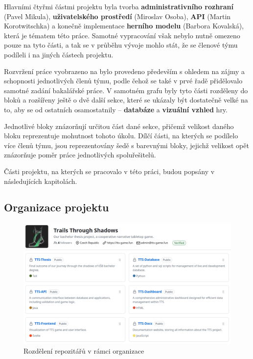 Hlavními čtyřmi částmi projektu byla tvorba \textbf{administrativního rozhraní} (Pavel Mikula), \textbf{uživatelského prostředí} (Miroslav Osoba), \textbf{API} (Martin Korotwitschka) a konečně implementace \textbf{herního modelu} (Barbora Kovalská), která je tématem této práce. Samotné vypracování však nebylo nutně omezeno pouze na tyto části, a tak se v průběhu vývoje mohlo stát, že se členové týmu podíleli i na jiných částech projektu.

Rozvržení práce vyobrazeno na  bylo provedeno především s ohledem na zájmy a schopnosti jednotlivých členů týmu, podle čehož se také v prvé řadě přidělovalo samotné zadání bakalářské práce. V samotném grafu byly tyto části rozděleny do bloků a rozšířeny ještě o dvě další sekce, které se ukázaly být dostatečně velké na to, aby se od ostatních osamostatnily -- \textbf{databáze} a \textbf{vizuální vzhled} hry. 

Jednotlivé bloky znázorňují určitou část dané sekce, přičemž velikost daného bloku reprezentuje mohutnost tohoto úkolu. Dílčí části, na kterých se podílelo více členů týmu, jsou reprezentovány šedě s barevnými bloky, jejichž velikost opět znázorňuje poměr práce jednotlivých spoluřešitelů.

Části projektu, na kterých se pracovalo v této práci, budou popsány v následujících kapitolách.

\subsection{Organizace projektu}
\label{subsec:versioning}

\begin{figure}[h]
    \centering
    \includegraphics[width=\textwidth]{../../shared/figures/gitOrg.png}
    \caption{Rozdělení repozitářů v rámci organizace}
    \label{fig:git_organization}
\end{figure}


